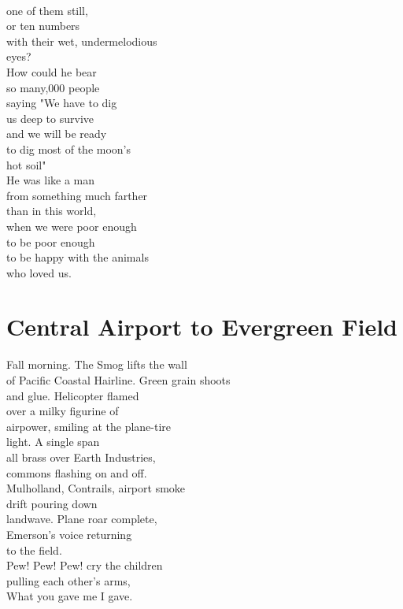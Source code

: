 \documentclass[smalldemyvopaper,11pt,twoside,onecolumn,openright,extrafontsizes]{memoir}
\begin{document}
\\one of them still,
\\or ten numbers
\\with their wet, undermelodious
\\eyes?
\\How could he bear
\\so many,000 people
\\saying "We have to dig
\\us deep to survive
\\and we will be ready
\\to dig most of the moon's
\\hot soil"
\\He was like a man
\\from something much farther
\\than in this world,
\\when we were poor enough
\\to be poor enough
\\to be happy with the animals
\\who loved us.



\chapter{Central Airport to Evergreen Field}
Fall morning. The Smog lifts the wall
\\of Pacific Coastal Hairline. Green grain shoots
\\and glue. Helicopter flamed
\\over a milky figurine of
\\airpower, smiling at the plane-tire
\\light. A single span
\\all brass over Earth Industries,
\\commons flashing on and off.
\\Mulholland, Contrails, airport smoke
\\drift pouring down
\\landwave. Plane roar complete,
\\Emerson's voice returning
\\to the field.
\\Pew! Pew! Pew! cry the children
\\pulling each other's arms,
\\What you gave me I gave.
\end{document}
